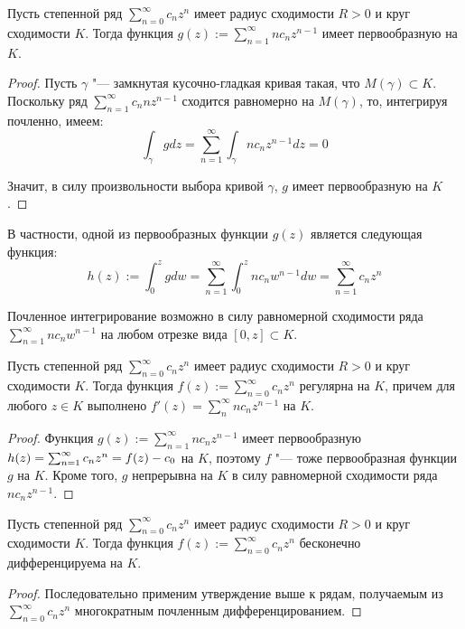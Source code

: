\begin{corollary}
	Пусть степенной ряд $\sum_{n=0}^\infty c_nz^n$ имеет радиус сходимости $R > 0$ и круг сходимости $K$. Тогда функция $g(z) := \sum_{n = 1}^\infty nc_nz^{n-1}$ имеет первообразную на $K$.
\end{corollary}

\begin{proof}
	Пусть $\gamma$ "--- замкнутая кусочно-гладкая кривая такая, что $M(\gamma) \subset K$. Поскольку ряд $\sum_{n = 1}^\infty c_nnz^{n-1}$ сходится равномерно на $M(\gamma)$, то, интегрируя почленно, имеем:
	\[\int_\gamma gdz = \sum_{n = 1}^\infty \int_\gamma nc_nz^{n-1}dz = 0\]
	
	Значит, в силу произвольности выбора кривой $\gamma$, $g$ имеет первообразную на $K$.
\end{proof}

\begin{note}
	В частности, одной из первообразных функции $g(z)$ является следующая функция:
	\[h(z) := \int_0^zgdw = \sum_{n=1}^\infty \int_0^znc_nw^{n-1}dw = \sum_{n=1}^\infty c_nz^n\]
	
	Почленное интегрирование возможно в силу равномерной сходимости ряда $\sum_{n = 1}^\infty n c_nw^{n-1}$ на любом отрезке вида $[0, z] \subset K$.
\end{note}

\begin{proposition}
	Пусть степенной ряд $\sum_{n=0}^\infty c_nz^n$ имеет радиус сходимости $R > 0$ и круг сходимости $K$. Тогда функция $f(z) := \sum_{n = 0}^\infty c_nz^{n}$ регулярна на $K$, причем для любого $z \in K$ выполнено $f'(z) = \sum_n^\infty nc_nz^{n-1}$ на $K$.
\end{proposition}

\begin{proof}
	Функция $g(z) := \sum_{n = 1}^\infty nc_nz^{n-1}$ имеет первообразную $h(z) = \sum_{n=1}^\infty c_nz^n \hm= f(z) - c_0$ на $K$, поэтому $f$ "--- тоже первообразная функции $g$ на $K$. Кроме того, $g$ непрерывна на $K$ в силу равномерной сходимости ряда $nc_nz^{n-1}$.
\end{proof}

\begin{corollary}
	Пусть степенной ряд $\sum_{n=0}^\infty c_nz^n$ имеет радиус сходимости $R > 0$ и круг сходимости $K$. Тогда функция $f(z) := \sum_{n = 0}^\infty c_nz^{n}$ бесконечно дифференцируема на $K$.
\end{corollary}

\begin{proof}
	Последовательно применим утверждение выше к рядам, получаемым из $\sum_{n=0}^\infty c_nz^n$ многократным почленным дифференцированием.
\end{proof}

